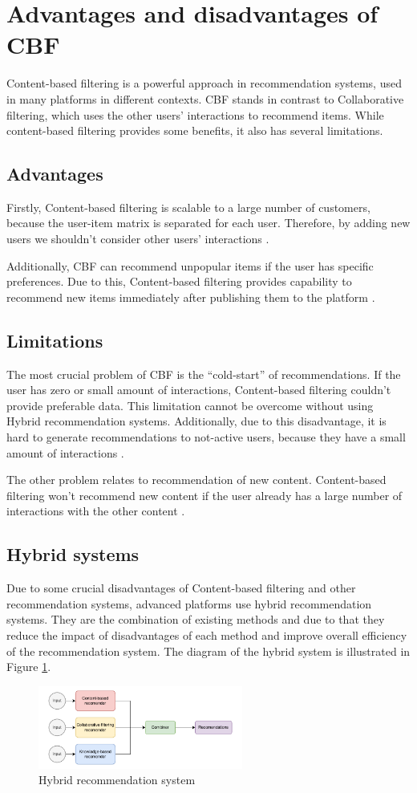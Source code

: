 \section{Advantages and disadvantages of CBF}\label{sec:cbf_advantages_disadvantages}
Content-based filtering is a powerful approach in recommendation systems, used in many platforms in different contexts. CBF stands in contrast to Collaborative filtering, which uses the other users' interactions to recommend items. While content-based filtering provides some benefits, it also has several limitations.

\subsection{Advantages}
Firstly, Content-based filtering is scalable to a large number of customers, because the user-item matrix is separated for each user. Therefore, by adding new users we shouldn't consider other users' interactions \cite{CBF_Advantages}.

Additionally, CBF can recommend unpopular items if the user has specific preferences. Due to this, Content-based filtering provides capability to recommend new items immediately after publishing them to the platform \cite{CBF_Advantages}.

\subsection{Limitations}
The most crucial problem of CBF is the “cold-start” of recommendations. If the user has zero or small amount of interactions, Content-based filtering couldn't provide preferable data. This limitation cannot be overcome without using Hybrid recommendation systems. Additionally, due to this disadvantage, it is hard to generate recommendations to not-active users, because they have a small amount of interactions \cite{CBF_Disadvantages}.

The other problem relates to recommendation of new content. Content-based filtering won't recommend new content if the user already has a large number of interactions with the other content \cite{CBF_Disadvantages}.

\subsection{Hybrid systems}
Due to some crucial disadvantages of Content-based filtering and other recommendation systems, advanced platforms use hybrid recommendation systems. They are the combination of existing methods and due to that they reduce the impact of disadvantages of each method and improve overall efficiency of the recommendation system\cite{Hybrid_recom_systems}. The diagram of the hybrid system is illustrated in Figure \ref{fig:hybrid_system}.

\begin{figure}
    \centering
    \includegraphics[width=0.6\textwidth]{figures/diagrams/hybrid_systems.pdf}
    \caption{Hybrid recommendation system}
    \label{fig:hybrid_system}
\end{figure}